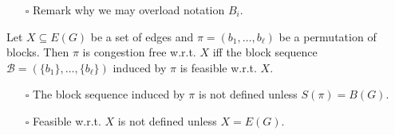 \documentclass[fontsize=11pt,paper=a4]{book}
\begin{document}
\begin{itemize}
\item[{$\square$}] Remark why we may overload notation \(B_i\).
\end{itemize}

\begin{lem}
Let \(X\subseteq E(G)\) be a set of edges and \(\pi=(b_1,\dots,b_{\ell})\) be a permutation of blocks.
Then \(\pi\) is congestion free w.r.t. \(X\) iff the block sequence \(\mathcal{B}=(\{b_1\},\dots,\{b_{\ell}\})\) induced by \(\pi\) is feasible w.r.t. \(X\).
\label{orgaf85aa9}
\end{lem}

\begin{itemize}
\item[{$\square$}] The block sequence induced by \(\pi\) is not defined unless \(S(\pi)=B(G)\).

\item[{$\square$}] Feasible w.r.t. \(X\) is not defined unless \(X=E(G)\).
\end{itemize}
\end{document}
